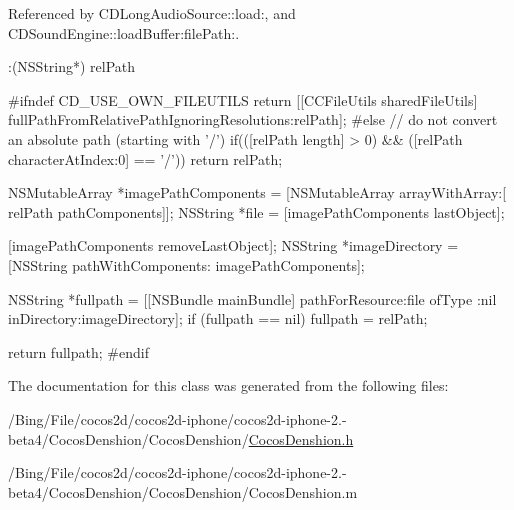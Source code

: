 Referenced by C\-D\-Long\-Audio\-Source\-::load\-:, and C\-D\-Sound\-Engine\-::load\-Buffer\-:file\-Path\-:.


\begin{DoxyCode}
                                     :(NSString*) relPath
{
#ifndef CD_USE_OWN_FILEUTILS
    return [[CCFileUtils sharedFileUtils] 
      fullPathFromRelativePathIgnoringResolutions:relPath];
#else
        // do not convert an absolute path (starting with '/')
        if(([relPath length] > 0) && ([relPath characterAtIndex:0] == '/'))
        {
                return relPath;
        }

        NSMutableArray *imagePathComponents = [NSMutableArray arrayWithArray:[
      relPath pathComponents]];
        NSString *file = [imagePathComponents lastObject];

        [imagePathComponents removeLastObject];
        NSString *imageDirectory = [NSString pathWithComponents:
      imagePathComponents];

        NSString *fullpath = [[NSBundle mainBundle] pathForResource:file ofType
      :nil inDirectory:imageDirectory];
        if (fullpath == nil)
                fullpath = relPath;

        return fullpath;
#endif
}
\end{DoxyCode}


The documentation for this class was generated from the following files\-:\begin{DoxyCompactItemize}
\item 
/\-Bing/\-File/cocos2d/cocos2d-\/iphone/cocos2d-\/iphone-\/2.-\/beta4/\-Cocos\-Denshion/\-Cocos\-Denshion/\hyperlink{_cocos_denshion_8h}{Cocos\-Denshion.\-h}\item 
/\-Bing/\-File/cocos2d/cocos2d-\/iphone/cocos2d-\/iphone-\/2.-\/beta4/\-Cocos\-Denshion/\-Cocos\-Denshion/Cocos\-Denshion.\-m\end{DoxyCompactItemize}
